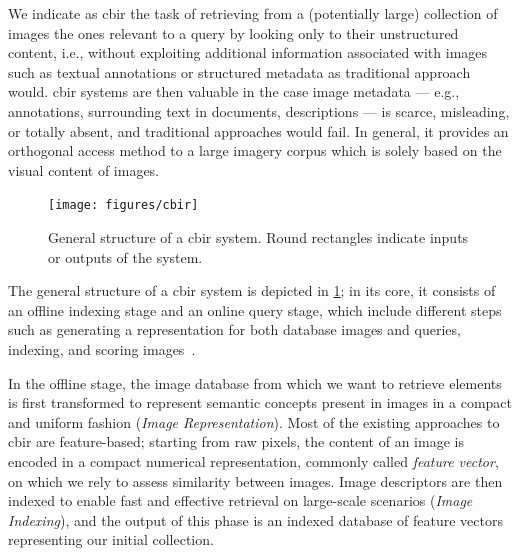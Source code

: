 We indicate as \acrfull{cbir} the task of retrieving from a (potentially large) collection of images the ones relevant to a query by looking only to their unstructured content, i.e., without exploiting additional information associated with images such as textual annotations or structured metadata as traditional approach would.
\gls{cbir} systems are then valuable in the case image metadata --- e.g., annotations, surrounding text in documents, descriptions --- is scarce, misleading, or totally absent, and traditional approaches would fail.
In general, it provides an orthogonal access method to a large imagery corpus which is solely based on the visual content of images.

\begin{figure}
    \texttt{[image: figures/cbir]}
    \caption{General structure of a \acrfull{cbir} system. Round rectangles indicate inputs or outputs of the system.}
    \label{fig:back:cbir}
\end{figure}
The general structure of a \gls{cbir} system is depicted in \ref{fig:back:cbir};
in its core, it consists of an offline indexing stage and an online query stage, which include different steps such as generating a representation for both database images and queries, indexing, and scoring images~\cite{zhou2017recent}.

In the offline stage, the image database from which we want to retrieve elements is first transformed to represent semantic concepts present in images in a compact and uniform fashion (\emph{Image Representation}).
Most of the existing approaches to \gls{cbir} are feature-based;
starting from raw pixels, the content of an image is encoded in a compact numerical representation, commonly called \emph{feature vector}, on which we rely to assess similarity between images.
Image descriptors are then indexed to enable fast and effective retrieval on large-scale scenarios (\emph{Image Indexing}), and the output of this phase is an indexed database of feature vectors representing our initial collection.

